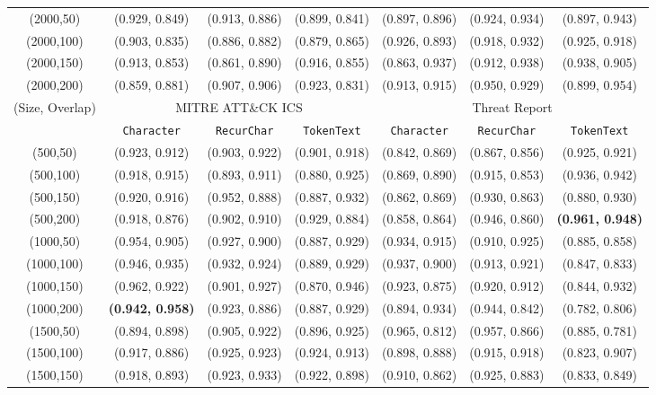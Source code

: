 \begin{table*}[]
{\begin{tabular}{c|ccc|ccc}
\midrule
(2000,50) & (0.929, 0.849) & (0.913, 0.886) & (0.899, 0.841)
& (0.897, 0.896) & (0.924, 0.934) & (0.897, 0.943)\\
(2000,100) & (0.903, 0.835) & (0.886, 0.882) & (0.879, 0.865)
& (0.926, 0.893) & (0.918, 0.932) & (0.925, 0.918)\\
(2000,150) & (0.913, 0.853) & (0.861, 0.890) & (0.916, 0.855)
& (0.863, 0.937) & (0.912, 0.938) & (0.938, 0.905)\\
(2000,200) & (0.859, 0.881) & (0.907, 0.906) & (0.923, 0.831)
& (0.913, 0.915) & (0.950, 0.929) & (0.899, 0.954)\\
\midrule
\midrule
\multirow{2}{*}{(Size, Overlap)} &\multicolumn{3}{c|}{MITRE ATT\&CK ICS} & \multicolumn{3}{c}{Threat Report} \\
& \texttt{Character} & \texttt{RecurChar} & \texttt{TokenText} & \texttt{Character} & \texttt{RecurChar} & \texttt{TokenText} \\
\midrule
(500,50) & (0.923, 0.912) & (0.903, 0.922) & (0.901, 0.918)
& (0.842, 0.869) & (0.867, 0.856) & (0.925, 0.921)\\
(500,100) & (0.918, 0.915) & (0.893, 0.911) & (0.880, 0.925)
& (0.869, 0.890) & (0.915, 0.853) & (0.936, 0.942)\\
(500,150) & (0.920, 0.916) & (0.952, 0.888) & (0.887, 0.932)
& (0.862, 0.869) & (0.930, 0.863) & (0.880, 0.930)\\
(500,200) & (0.918, 0.876) & (0.902, 0.910) & (0.929, 0.884)
& (0.858, 0.864) & (0.946, 0.860) & \textbf{(0.961, 0.948)} \\
\midrule
(1000,50) & (0.954, 0.905) & (0.927, 0.900) & (0.887, 0.929)
& (0.934, 0.915) & (0.910, 0.925) & (0.885, 0.858)\\
(1000,100) & (0.946, 0.935) & (0.932, 0.924) & (0.889, 0.929) & (0.937, 0.900) & (0.913, 0.921) & (0.847, 0.833)\\
(1000,150) & (0.962, 0.922) & (0.901, 0.927) & (0.870, 0.946) & (0.923, 0.875) & (0.920, 0.912) & (0.844, 0.932)\\
(1000,200) & \textbf{(0.942, 0.958)} & (0.923, 0.886) & (0.887, 0.929) & (0.894, 0.934) & (0.944, 0.842) & (0.782, 0.806)\\
\midrule
(1500,50) & (0.894, 0.898) & (0.905, 0.922) & (0.896, 0.925) & (0.965, 0.812) & (0.957, 0.866) & (0.885, 0.781)\\
(1500,100) & (0.917, 0.886) & (0.925, 0.923) & (0.924, 0.913) & (0.898, 0.888) & (0.915, 0.918) & (0.823, 0.907)\\
(1500,150) & (0.918, 0.893) & (0.923, 0.933) & (0.922, 0.898) & (0.910, 0.862) & (0.925, 0.883) & (0.833, 0.849)\\

\end{tabular}}
\end{table*}
